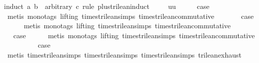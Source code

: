\begin{isabellebody}
{\isacharparenleft}induct\ a\ b\ \ arbitrary{\isacharcolon}\ c\ rule{\isacharcolon}\ plus{\isacharunderscore}trilean{\isachardot}induct{\isacharparenright}\isanewline
\ \ \isamarkupfalse%
\ {\isacharparenleft}{}\ uu{\isacharparenright}\isanewline
\ \ \isamarkupfalse%
\ \isamarkupfalse%
\ {\isacharquery}case\isanewline
\ \ \ \ \isamarkupfalse%
\ {\isacharparenleft}metis\ {\isacharparenleft}mono{\isacharunderscore}tags{\isacharcomma}\ lifting{\isacharparenright}\ times{\isacharunderscore}trilean{\isachardot}simps{\isacharparenleft}{}{\isacharparenright}\ times{\isacharunderscore}trilean{\isacharunderscore}commutative{\isacharparenright}\isanewline
{}\isamarkupfalse%
\isanewline
{}\isamarkupfalse%
\ {\isachardoublequoteopen}{}{\isacharunderscore}{}{\isachardoublequoteclose}\isanewline
\ \ \isamarkupfalse%
\ \isamarkupfalse%
\ {\isacharquery}case\isanewline
\ \ \ \ \isamarkupfalse%
\ {\isacharparenleft}metis\ {\isacharparenleft}mono{\isacharunderscore}tags{\isacharcomma}\ lifting{\isacharparenright}\ times{\isacharunderscore}trilean{\isachardot}simps{\isacharparenleft}{}{\isacharparenright}\ times{\isacharunderscore}trilean{\isacharunderscore}commutative{\isacharparenright}\isanewline
{}\isamarkupfalse%
\isanewline
\ \ \isamarkupfalse%
\ {\isachardoublequoteopen}{}{\isacharunderscore}{}{\isachardoublequoteclose}\isanewline
\ \ \isamarkupfalse%
\ \isamarkupfalse%
\ {\isacharquery}case\isanewline
\ \ \ \ \isamarkupfalse%
\ {\isacharparenleft}metis\ {\isacharparenleft}mono{\isacharunderscore}tags{\isacharcomma}\ lifting{\isacharparenright}\ times{\isacharunderscore}trilean{\isachardot}simps{\isacharparenleft}{}{\isacharparenright}\ times{\isacharunderscore}trilean{\isacharunderscore}commutative{\isacharparenright}\isanewline
{}\isamarkupfalse%
\isanewline
\ \ \isamarkupfalse%
\ {\isachardoublequoteopen}{}{\isacharunderscore}{}{\isachardoublequoteclose}\isanewline
\ \ \isamarkupfalse%
\ \isamarkupfalse%
\ {\isacharquery}case\isanewline
\ \ \ \ \isamarkupfalse%
\ {\isacharparenleft}metis\ times{\isacharunderscore}trilean{\isachardot}simps{\isacharparenleft}{}{\isacharparenright}\ times{\isacharunderscore}trilean{\isachardot}simps{\isacharparenleft}{}{\isacharparenright}\ times{\isacharunderscore}trilean{\isachardot}simps{\isacharparenleft}{}{\isacharparenright}\ trilean{\isachardot}exhaust{\isacharparenright}\isanewline

\end{isabellebody}
